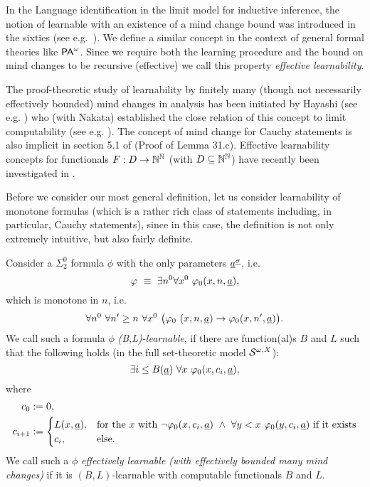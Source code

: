 In the Language identification in the limit model for inductive inference, the 
notion of learnable with an existence of a mind change bound was introduced in 
the sixties (see e.g.~\cite{Gold(67)}). We define a similar concept in the context of 
general formal theories like ${\textsf{\upshape PA}}^\omega$. Since we require both the learning 
procedure and the bound on mind changes to be recursive (effective) we call 
this property {\em effective learnability}. 
\begin{rmk}
The proof-theoretic study of 
learnability by finitely 
many (though not necessarily effectively bounded) mind changes in analysis 
has been initiated by Hayashi (see e.g. \cite{Hayashi02,Hayashi06}) 
who (with Nakata) 
established the close relation of this 
concept to limit computability (see e.g. 
\cite{Hayashi/Nakata}). The concept of mind change for Cauchy statements is 
also implicit in section 5.1 of \cite{Ziegler(07)} (Proof of Lemma 31.c). 
Effective learnability concepts for 
functionals $F:D\to\mathbb{N}^{\mathbb{N}}$ (with $D\subseteq\mathbb{N}^{\mathbb{N}}$) have recently 
been investigated in \cite{Higuchi/Kihara}.
\end{rmk}
Before we consider our most general definition, let us consider learnability of monotone formulas (which is a rather rich class of statements including, in 
particular, Cauchy statements), since in this case, the definition is not 
only extremely intuitive, but also fairly definite.

% 
%
\begin{dfn}\label{d:fmcMon}
Consider a $\Sigma^0_2$ formula $\phi$ with the only parameters $\underline a^{\underline \sigma}$, i.e.
\[\varphi\ \equiv\ \exists n^0 \forall x^0\ \varphi_0(x,n,\underline a),\]
which is monotone in $n$, i.e.
\[ 
\forall n^0\ \forall n'\ge n\ \forall x^0\ \big(  \varphi_0\ (x,n,\underline a) \rightarrow  \varphi_0(x,n',\underline a) \big).
\]
We call such a formula $\phi$ 
{\em (B,L)-learnable},
if there are function(al)s $B$ and $L$ such that the following holds 
(in the full set-theoretic model ${\cal S}^{\omega,X}$):
\[ 
\exists i\leq B(\tup a)\ \forall x\ \phi_0(x,c_i,\tup a),\] where
\begin{align*}
c_0&:=0,\\
c_{i+1}&:=
\begin{cases}
L(x, \tup a),&\text{for the $x$ with } \neg\phi_0(x,c_i,\tup a)\ \wedge\ \forall y<x\ \phi_0(y,c_i,\tup a) \text{ if it exists}\\
c_i,&\Telse.
\end{cases}
\end{align*}
We call such a $\phi$ 
{\em effectively learnable (with effectively bounded many mind changes)} 
if it is $(B,L)$-learnable with computable functionals $B$ and $L.$ 
\end{dfn}


